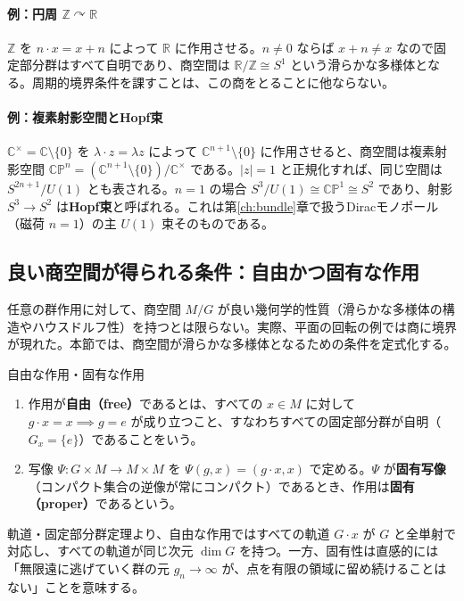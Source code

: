 \documentclass[uplatex, dvipdfmx, book]{jsbook}
\let\origsubsection\subsection
\let\origsubsubsection\subsubsection
\renewcommand{\section}{\origsubsection}
\renewcommand{\subsection}{\origsubsubsection}
\renewcommand{\subsubsection}{\paragraph}
\begin{document}
\paragraph{例：円周 $\mathbb{Z} \curvearrowright \mathbb{R}$}
$\mathbb{Z}$ を $n \cdot x = x + n$ によって $\mathbb{R}$ に作用させる。$n \neq 0$ ならば $x + n \neq x$ なので固定部分群はすべて自明であり、商空間は $\mathbb{R}/\mathbb{Z} \cong S^1$ という滑らかな多様体となる。周期的境界条件を課すことは、この商をとることに他ならない。

\paragraph{例：複素射影空間とHopf束}
$\mathbb{C}^\times = \mathbb{C} \setminus \{0\}$ を $\lambda \cdot z = \lambda z$ によって $\mathbb{C}^{n+1} \setminus \{0\}$ に作用させると、商空間は複素射影空間 $\mathbb{CP}^n = (\mathbb{C}^{n+1} \setminus \{0\}) / \mathbb{C}^\times$ である。$|z| = 1$ と正規化すれば、同じ空間は $S^{2n+1}/U(1)$ とも表される。$n = 1$ の場合 $S^3/U(1) \cong \mathbb{CP}^1 \cong S^2$ であり、射影 $S^3 \to S^2$ は\textbf{Hopf束}と呼ばれる。これは第\ref{ch:bundle}章で扱うDiracモノポール（磁荷 $n = 1$）の主 $U(1)$ 束そのものである。


\section{良い商空間が得られる条件：自由かつ固有な作用}

任意の群作用に対して、商空間 $M/G$ が良い幾何学的性質（滑らかな多様体の構造やハウスドルフ性）を持つとは限らない。実際、平面の回転の例では商に境界が現れた。本節では、商空間が滑らかな多様体となるための条件を定式化する。

\begin{mydef}{自由な作用・固有な作用}{}
\begin{enumerate}
    \item 作用が\textbf{自由（free）}であるとは、すべての $x \in M$ に対して $g \cdot x = x \implies g = e$ が成り立つこと、すなわちすべての固定部分群が自明（$G_x = \{e\}$）であることをいう。
    \item 写像 $\Psi: G \times M \to M \times M$ を $\Psi(g, x) = (g \cdot x, x)$ で定める。$\Psi$ が\textbf{固有写像}（コンパクト集合の逆像が常にコンパクト）であるとき、作用は\textbf{固有（proper）}であるという。
\end{enumerate}
\end{mydef}

軌道・固定部分群定理より、自由な作用ではすべての軌道 $G \cdot x$ が $G$ と全単射で対応し、すべての軌道が同じ次元 $\dim G$ を持つ。一方、固有性は直感的には「無限遠に逃げていく群の元 $g_n \to \infty$ が、点を有限の領域に留め続けることはない」ことを意味する。
\end{document}
